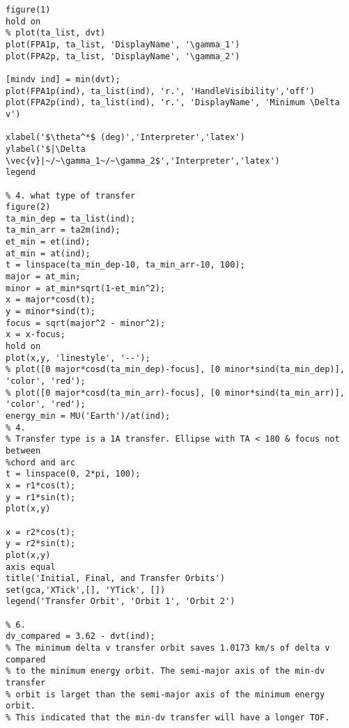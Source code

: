 \begin{lstlisting}[frame=lines,style=Matlab-editor,basicstyle = \mlttfamily]
figure(1)
hold on
% plot(ta_list, dvt)
plot(FPA1p, ta_list, 'DisplayName', '\gamma_1')
plot(FPA2p, ta_list, 'DisplayName', '\gamma_2')

[mindv ind] = min(dvt);
plot(FPA1p(ind), ta_list(ind), 'r.', 'HandleVisibility','off')
plot(FPA2p(ind), ta_list(ind), 'r.', 'DisplayName', 'Minimum \Delta v')

xlabel('$\theta^*$ (deg)','Interpreter','latex')
ylabel('$|\Delta \vec{v}|~/~\gamma_1~/~\gamma_2$','Interpreter','latex')
legend

% 4. what type of transfer
figure(2)
ta_min_dep = ta_list(ind);
ta_min_arr = ta2m(ind);
et_min = et(ind);
at_min = at(ind);
t = linspace(ta_min_dep-10, ta_min_arr-10, 100);
major = at_min;
minor = at_min*sqrt(1-et_min^2);
x = major*cosd(t);
y = minor*sind(t);
focus = sqrt(major^2 - minor^2);
x = x-focus;
hold on
plot(x,y, 'linestyle', '--');
% plot([0 major*cosd(ta_min_dep)-focus], [0 minor*sind(ta_min_dep)], 'color', 'red');
% plot([0 major*cosd(ta_min_arr)-focus], [0 minor*sind(ta_min_arr)], 'color', 'red');
energy_min = MU('Earth')/at(ind);
% 4.
% Transfer type is a 1A transfer. Ellipse with TA < 180 & focus not between
%chord and arc
t = linspace(0, 2*pi, 100);
x = r1*cos(t);
y = r1*sin(t);
plot(x,y)

x = r2*cos(t);
y = r2*sin(t);
plot(x,y)
axis equal
title('Initial, Final, and Transfer Orbits')
set(gca,'XTick',[], 'YTick', [])
legend('Transfer Orbit', 'Orbit 1', 'Orbit 2')

% 6.
dv_compared = 3.62 - dvt(ind);
% The minimum delta v transfer orbit saves 1.0173 km/s of delta v compared
% to the minimum energy orbit. The semi-major axis of the min-dv transfer
% orbit is larget than the semi-major axis of the minimum energy orbit.
% This indicated that the min-dv transfer will have a longer TOF.

\end{lstlisting}
